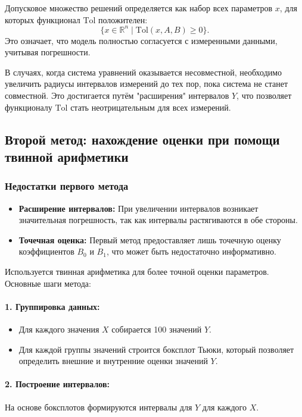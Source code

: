 \documentclass[a4paper,14pt]{extarticle}
\begin{document}
Допусковое множество решений определяется как набор всех параметров $x$, для которых функционал $\text{Tol}$ положителен:
\[
\{x \in \mathbb{R}^n \mid \text{Tol}(x, A, B) \geq 0\}.
\]
Это означает, что модель полностью согласуется с измеренными данными, учитывая погрешности.

В случаях, когда система уравнений оказывается несовместной, необходимо увеличить радиусы интервалов измерений до тех пор, пока система не станет совместной. Это достигается путём "расширения" интервалов $Y$, что позволяет функционалу $\text{Tol}$ стать неотрицательным для всех измерений.

\subsection{Второй метод: нахождение оценки при помощи твинной арифметики}

\subsubsection*{Недостатки первого метода}
\begin{itemize}
    \item \textbf{Расширение интервалов:} При увеличении интервалов возникает значительная погрешность, так как интервалы растягиваются в обе стороны.
    \item \textbf{Точечная оценка:} Первый метод предоставляет лишь точечную оценку коэффициентов $B_0$ и $B_1$, что может быть недостаточно информативно.
\end{itemize}

Используется твинная арифметика для более точной оценки параметров. Основные шаги метода:

\paragraph{1. Группировка данных:}
\begin{itemize}
    \item Для каждого значения $X$ собирается 100 значений $Y$.
    \item Для каждой группы значений строится боксплот Тьюки, который позволяет определить внешние и внутренние оценки значений $Y$.
\end{itemize}

\paragraph{2. Построение интервалов:}
На основе боксплотов формируются интервалы для $Y$ для каждого $X$.
\end{document}
